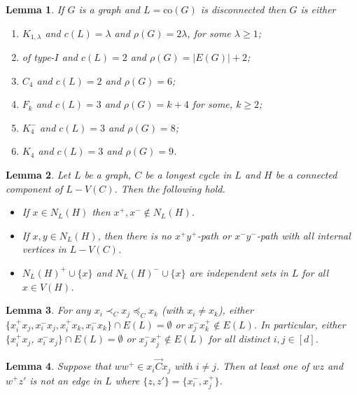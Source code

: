 \documentclass[10pt,a4paper]{amsart}
\newtheorem{lem}{Lemma}
\newcommand{\co}{\text{co}}
\begin{document}
\begin{lem}\label{l:disconColineGraph}
If $G$ is a graph and $L=\co(G)$ is disconnected then $G$ is either
\begin{enumerate}
\item[(i)] $K_{1,\lambda}$ and $c(L)=\lambda$ and $\rho(G)=2\lambda$, for some $\lambda \geq 1$; 
\item[(ii)] of type-$I$ and $c(L)=2$ and $\rho(G)=|E(G)|+2$; 
\item[(iii)] $C_4$ and $c(L)=2$ and $\rho(G)=6$;
\item[(iv)] $F_k$ and $c(L)=3$ and $\rho(G) = k+4$ for some, $k\geq 2$;  %
\item[(v)] $K_4^-$ and $c(L) = 3$ and $\rho(G)=8$; 
\item[(vi)] $K_4$ and $c(L)=3$ and $\rho(G)=9$.
\end{enumerate}
\end{lem}

\begin{lem}\label{l:propsOfLongestCycle}
Let $L$ be a graph, $C$ be a longest cycle in $L$ and $H$ be a connected component of $L-V(C)$. Then the following hold.
\begin{itemize}
\item[(i)] If $x \in N_L(H)$ then $x^+,x^- \notin N_L(H)$.
\item[(ii)] If $x,y \in N_L(H)$, then there is no $x^+y^+$-path or  $x^-y^-$-path with all internal vertices in $L-V(C)$.
\item[(iii)] $N_L(H)^+\cup\{x\}$ and $N_L(H)^-\cup\{x\}$ are independent sets in $L$ for all $x \in V(H)$.
\end{itemize}
\end{lem}

\begin{lem}\label{l:common_arg}
For any $x_i\prec_C x_j \preceq_C x_k$ (with $x_i\neq x_k$), %
either
$\{x_i^+ x_j, x_i^- x_j, x_i^+ x_k, x_i^-x_k\}\cap E(L) = \emptyset$ or $x_j^- x_k^+ \notin E(L)$. 
In particular, either  $\{x_i^+ x_j$, $x_i^- x_j\}\cap E(L) = \emptyset$ or $x_j^- x_j^+ \notin E(L)$ for all distinct $i,j \in [d]$.
\end{lem} 

\begin{lem}\label{l:nonXYedgesExtendCycle}
Suppose that $ww^+ \in x_i\overrightarrow{C}x_j$ with $i\neq j$. Then at least one of $wz$ and $w^+z'$ is not an edge in $L$ where $\{z,z'\}= \{x_i^-,x_j^+\}$.
\end{lem}
\end{document}
